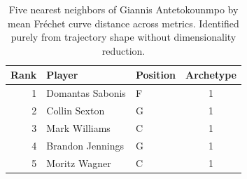 \begin{table}[htbp]
  \centering\small
  \begin{tabular}{rllc}
    \toprule
    Rank & Player & Position & Archetype \\
    \midrule
    1 & Domantas Sabonis & F & 1 \\
    2 & Collin Sexton & G & 1 \\
    3 & Mark Williams & C & 1 \\
    4 & Brandon Jennings & G & 1 \\
    5 & Moritz Wagner & C & 1 \\
    \bottomrule
  \end{tabular}
  \caption{Five nearest neighbors of Giannis Antetokounmpo by mean Fr\'{e}chet curve distance across metrics. Identified purely from trajectory shape without dimensionality reduction.}
  \label{tab:Giannis_Antetokounmpo_frechet_curve_neighbors}
\end{table}

